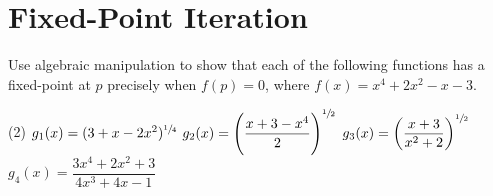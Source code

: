 \documentclass[../../../../Assignments]{subfiles}
\begin{document}
\section{Fixed-Point Iteration}

\begin{exercise}\label{exer:2.2.1}
    Use algebraic manipulation to show that each of the following functions has
    a fixed-point at \(p\) precisely when \(f(p) = 0\), where \(f(x) = x^4 +
    2x^2 - x - 3\).

\begin{tasks}(2)
    \task \(g_1(x) = (3 + x - 2x^2)^{\sfrac{1}{4}}\)
    \task \(g_2(x) = \left(\dfrac{x + 3 - x^4}{2}\right)^{\sfrac{1}{2}}\)
    \task \(g_3(x) = \left(\dfrac{x + 3}{x^2 + 2}\right)^{\sfrac{1}{2}}\)
    \task \(g_4(x) = \dfrac{3x^4 + 2x^2 + 3}{4x^3 + 4x - 1}\)
\end{tasks}
\end{exercise}
\end{document}
